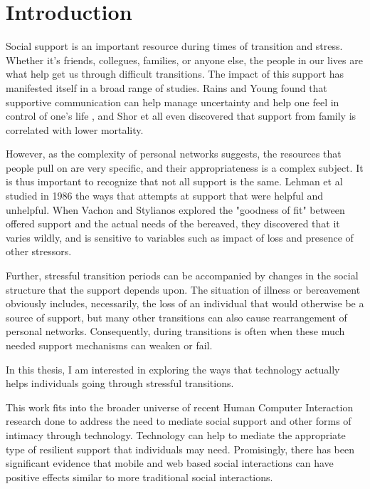 \chapter{Introduction}
  Social support is an important resource during times of transition and stress.
  Whether it's friends, collegues, families, or anyone else, the people in our lives
  are what help get us through difficult transitions.
  \cite{mikal13}
  The impact of this support has manifested itself in a broad range of studies.
  Rains and Young found that supportive communication can help manage uncertainty and
  help one feel in control of one's life \cite{rains09},
  and Shor et all even discovered that support from
  family is correlated with lower mortality. \cite{shor13}

  However, as the complexity of personal networks suggests, the resources that people pull on
  are very specific,
  and their appropriateness is a complex subject.
  It is thus important to recognize that not all support is the same.
  Lehman et al studied in 1986 the ways that attempts at support that were helpful and unhelpful.
  \cite{lehman86}
  When Vachon and Stylianos explored the "goodness of fit" between offered support and the actual needs of
  the bereaved, they discovered that it varies wildly, and is sensitive to variables such as impact of loss
  and presence of other stressors.
  \cite{vachon88}
  
  Further, stressful transition periods can be accompanied by changes in the social structure
  that the support depends upon.
  The situation of illness or bereavement obviously includes, necessarily,
  the loss of an individual that would otherwise be a source of support,
  but many other transitions can also cause rearrangement of personal networks.
  Consequently, during transitions is often when these much needed
  support mechanisms can weaken or fail.
  \cite{mikal13}

  In this thesis, I am interested in exploring
  the ways that technology actually helps individuals going
  through stressful transitions.

  This work fits into the broader universe of
  recent Human Computer Interaction research
  done to address the need to mediate social support
  and other forms of intimacy through technology.
  \cite{hassenzhal12}
  Technology can help to mediate the appropriate type of resilient support
  that individuals may need.
  Promisingly, there has been significant evidence that
  mobile and web based social interactions can have positive effects similar
  to more traditional social interactions.
  \cite{??}


